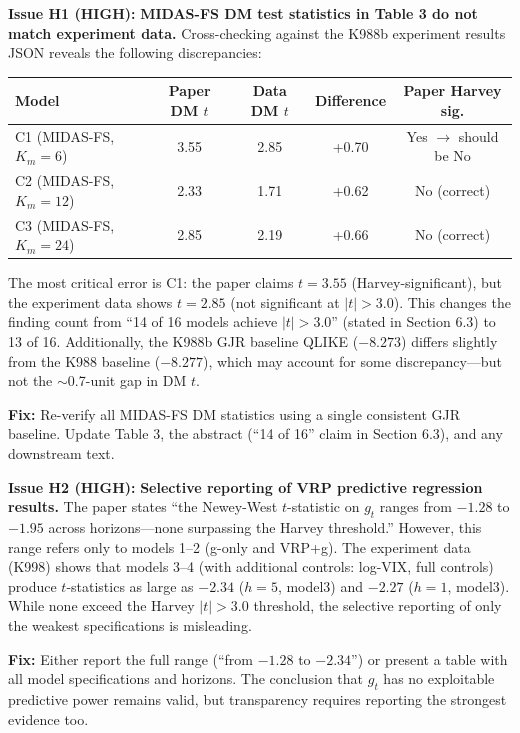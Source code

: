\documentclass[12pt,a4paper]{article}
\begin{document}
\textcolor{errorred}{\textbf{Issue H1 (HIGH):}} \textbf{MIDAS-FS DM test statistics in Table 3 do not match experiment data.} Cross-checking against the K988b experiment results JSON reveals the following discrepancies:

\begin{center}
\begin{tabular}{@{}lcccc@{}}
\toprule
Model & Paper DM $t$ & Data DM $t$ & Difference & Paper Harvey sig. \\
\midrule
C1 (MIDAS-FS, $K_m=6$)  & 3.55 & 2.85 & +0.70 & Yes $\to$ should be No \\
C2 (MIDAS-FS, $K_m=12$) & 2.33 & 1.71 & +0.62 & No (correct) \\
C3 (MIDAS-FS, $K_m=24$) & 2.85 & 2.19 & +0.66 & No (correct) \\
\bottomrule
\end{tabular}
\end{center}

The most critical error is C1: the paper claims $t = 3.55$ (Harvey-significant), but the experiment data shows $t = 2.85$ (not significant at $|t| > 3.0$). This changes the finding count from ``14 of 16 models achieve $|t| > 3.0$'' (stated in Section 6.3) to 13 of 16. Additionally, the K988b GJR baseline QLIKE ($-8.273$) differs slightly from the K988 baseline ($-8.277$), which may account for some discrepancy---but not the $\sim$0.7-unit gap in DM $t$.

\textbf{Fix:} Re-verify all MIDAS-FS DM statistics using a single consistent GJR baseline. Update Table 3, the abstract (``14 of 16'' claim in Section 6.3), and any downstream text.

\bigskip

\textcolor{errorred}{\textbf{Issue H2 (HIGH):}} \textbf{Selective reporting of VRP predictive regression results.} The paper states ``the Newey-West $t$-statistic on $g_t$ ranges from $-1.28$ to $-1.95$ across horizons---none surpassing the Harvey threshold.'' However, this range refers only to models 1--2 (g-only and VRP+g). The experiment data (K998) shows that models 3--4 (with additional controls: log-VIX, full controls) produce $t$-statistics as large as $-2.34$ ($h=5$, model3) and $-2.27$ ($h=1$, model3). While none exceed the Harvey $|t|>3.0$ threshold, the selective reporting of only the weakest specifications is misleading.

\textbf{Fix:} Either report the full range (``from $-1.28$ to $-2.34$'') or present a table with all model specifications and horizons. The conclusion that $g_t$ has no exploitable predictive power remains valid, but transparency requires reporting the strongest evidence too.
\end{document}
